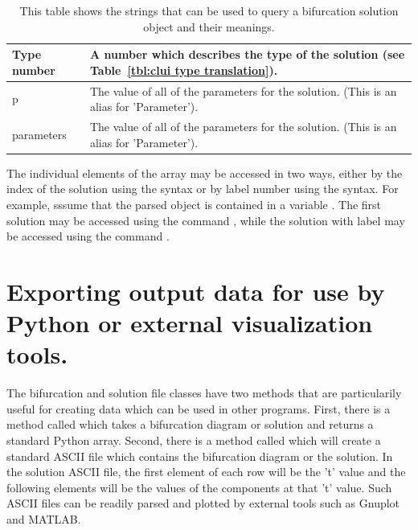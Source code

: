 \documentclass[12pt]{report}
\begin{document}
\begin{table}[htbp]
\begin{center}
\begin{tabular}{| l | l |}
 \hline
 Type number & \begin{minipage}{4in} \smallskip A number which describes the type of the solution (see Table~\ref{tbl:clui type translation}).  \smallskip \end{minipage} \\  
 \hline
 p & \begin{minipage}{4in} \smallskip The value of all of the parameters for the solution. (This is an alias for 'Parameter'). \smallskip \end{minipage} \\  
 \hline
 parameters & \begin{minipage}{4in} \smallskip The value of all of the parameters for the solution. (This is an alias for 'Parameter').\smallskip \end{minipage} \\  
 \hline
 \end{tabular}
 \caption[Contents of a bifurcation solution object.]
 {This table shows the strings that can be used to
 query a bifurcation solution object and their
 meanings.}
 \label{tbl:clui parse solution}
 \end{center}
 \end{table}

 The individual elements of the array may be accessed 
 in two ways, either by the index of the solution using the
 \commandf{[]} syntax or by label number using the
 \commandf{()} syntax.  For example, sssume that the parsed object is contained
 in a variable .  
 The first solution may be accessed 
 using the command , while the solution with
 label  may be accessed using the command .

 \section{Exporting output data for use by Python or external
   visualization tools.}

 The bifurcation and solution file classes have two methods that are 
 particularily useful for creating data which can be used in other
 programs.  First, there is a method called  which
 takes a bifurcation diagram or solution and
 returns a standard Python array.  Second, there is a method called
  which will create a standard ASCII file
 which contains the bifurcation diagram or the solution. 
 In the solution ASCII file, the first element of each row will be
 the 't' value and the following elements will be the
 values of the components at that 't' value. Such ASCII files
 can be readily parsed and plotted by external tools such as
 Gnuplot and MATLAB.
\end{document}
